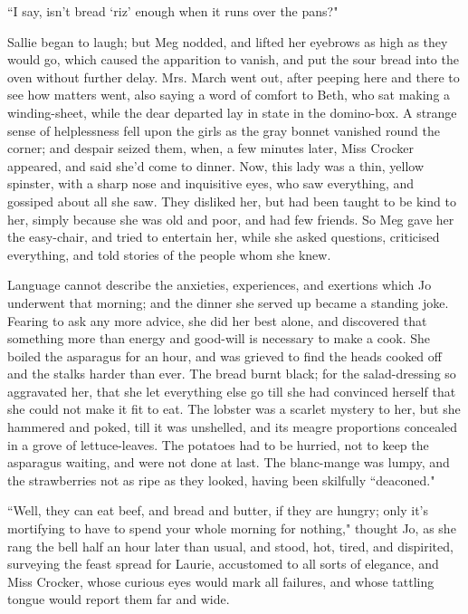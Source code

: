 ``I say, isn't bread
`riz' enough when it runs over the
pans?"

Sallie began to laugh; but Meg nodded, and lifted her eyebrows as high
as they would go, which caused the apparition to vanish, and put the
sour bread into the oven without further delay. Mrs. March went out,
after peeping here and there to see how matters went, also saying a word
of comfort to Beth, who sat making a winding-sheet, while the dear
departed lay in state in the domino-box. A strange sense of helplessness
fell upon the girls as the gray bonnet vanished round the corner; and
despair seized them, when, a few minutes later, Miss Crocker appeared,
and said she'd come to dinner. Now, this lady was a
thin, yellow spinster, with a sharp nose and inquisitive eyes, who saw
everything, and gossiped about all she saw. They disliked her, but had
been taught to be kind to her, simply because she was old and poor, and
had few friends. So Meg gave her the easy-chair, and tried to entertain
her, while she asked questions, criticised everything, and told stories
of the people whom she knew.

Language cannot describe the anxieties, experiences, and exertions which
Jo underwent that morning; and the dinner she served up became a
standing joke. Fearing to ask any more advice, she did her best alone,
and discovered that something more than energy and good-will is
necessary to make a cook. She boiled the asparagus for an hour, and was
grieved to find the heads cooked off and the stalks harder than ever.
The bread burnt black; for the salad-dressing so aggravated her, that
she let everything else go till she had convinced herself that she could
not make it fit to eat. The lobster was a scarlet mystery to her, but
she hammered and poked, till it was unshelled, and its meagre
proportions concealed in a grove of lettuce-leaves. The potatoes had to
be hurried, not to keep the asparagus waiting, and were not done at
last. The blanc-mange was lumpy, and the strawberries not as ripe as
they looked, having been skilfully ``deaconed."

``Well, they can eat beef, and bread and butter, if they are hungry; only
it's mortifying to have to spend your whole morning for
nothing," thought Jo, as she rang the bell half an hour later than
usual, and stood, hot, tired, and dispirited, surveying the feast spread
for Laurie, accustomed to all sorts of elegance, and Miss Crocker, whose
curious eyes would mark all failures, and whose tattling tongue would
report them far and wide.

